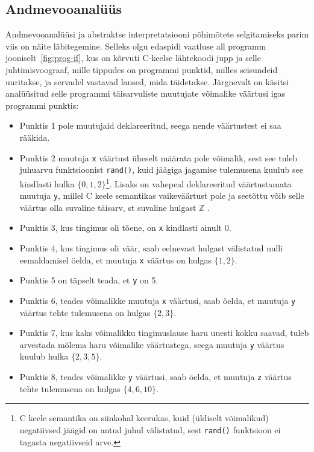 \documentclass[../thesis.tex]{subfiles}
\begin{document}
\subsection{Andmevooanalüüs}
Andmevooanalüüsi ja abstraktse interpretatsiooni põhimõtete selgitamiseks parim viis on näite läbitegemine. Selleks olgu edaspidi vaatluse all programm jooniselt~\ref{fig:prog-if}, kus on kõrvuti C-keelse lähtekoodi jupp ja selle juhtimisvoograaf, mille tippudes on programmi punktid, milles seisundeid uuritakse, ja servadel vastavad laused, mida täidetakse.
Järgnevalt on käsitsi analüüsitud selle programmi täisarvuliste muutujate võimalike väärtusi igas programmi punktis:
\begin{itemize}
	\item Punktis 1 pole muutujaid deklareeritud, seega nende väärtustest ei saa rääkida.
	\item Punktis 2 muutuja \texttt{x} väärtust üheselt määrata pole võimalik, sest see tuleb juhuarvu funktsioonist \texttt{rand()}, kuid jäägiga jagamise tulemusena kuulub see kindlasti hulka $\{0, 1, 2\}$\footnote{C keele semantika on siinkohal keerukas, kuid (üldiselt võimalikud) negatiivsed jäägid on antud juhul välistatud, sest \texttt{rand()} funktsioon ei tagasta negatiivseid arve.}.
	Lisaks on vahepeal deklareeritud väärtustamata muutuja \texttt{y}, millel C keele semantikas vaikeväärtust pole ja seetõttu võib selle väärtus olla suvaline täisarv, st suvaline hulgast $\mathbb{Z}$ \cite{C11_draft}.
	\item Punktis 3, kus tingimus oli tõene, on \texttt{x} kindlasti ainult 0.
	\item Punktis 4, kus tingimus oli väär, saab eelnevast hulgast välistatud nulli eemaldamisel öelda, et muutuja \texttt{x} väärtus on hulgas $\{1, 2\}$.
	\item Punktis 5 on täpselt teada, et \texttt{y} on 5.
	\item Punktis 6, teades võimalikke muutuja \texttt{x} väärtusi, saab öelda, et muutuja \texttt{y} väärtus tehte tulemusena on hulgas $\{2, 3\}$.
	\item Punktis 7, kus kaks võimalikku tingimuslause haru uuesti kokku saavad, tuleb arvestada mõlema haru võimalike väärtustega, seega muutuja \texttt{y} väärtus kuulub hulka $\{2, 3, 5\}$.
	\item Punktis 8, teades võimalikke \texttt{y} väärtusi, saab öelda, et muutuja \texttt{z} väärtus tehte tulemusena on hulgas $\{4, 6, 10\}$.
\begin{comment}
	\item Punktides 1, 2 ja 3 on muutuja veel väärtustamata. Kuna C keele semantika sellisel juhul mingit vaikeväärtust ei anna, siis võimalikke väärtusi kirjeldab kõige ebatäpsem domeeni element $\top = \mathbb{Z}$.
	\item Punktis 4 on muutujale just antud konstantne väärtus, mistõttu seda kirjeldab kõige paremini element $\{5\}$.


\end{comment}
\end{itemize}
\end{document}
